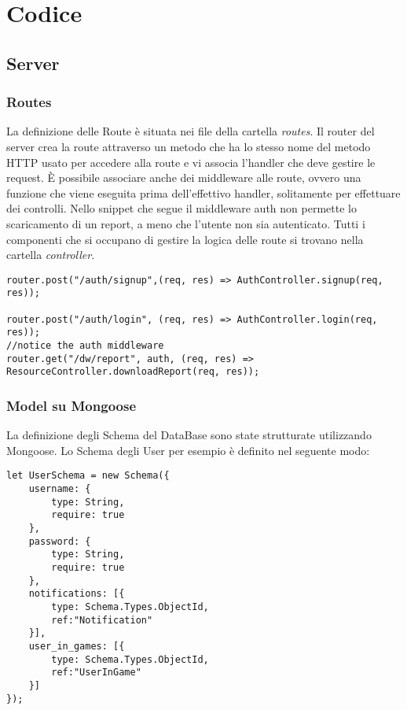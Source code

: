 \chapter{Codice}

\section{Server}

\subsection{Routes}
La definizione delle Route è situata nei file della cartella \textit{routes}.\newline
Il router del server crea la route attraverso un metodo che ha lo stesso nome del metodo HTTP usato per accedere alla route e vi associa l'handler che deve gestire le request.\newline
È possibile associare anche dei middleware alle route, ovvero una funzione che viene eseguita prima dell'effettivo handler, solitamente per effettuare dei controlli.\newline
Nello snippet che segue il middleware auth non permette lo scaricamento di un report, a meno che l'utente non sia autenticato.\newline
Tutti i componenti che si occupano di gestire la logica delle route si trovano nella cartella \textit{controller}.

\begin{verbatim}
router.post("/auth/signup",(req, res) => AuthController.signup(req, res));

router.post("/auth/login", (req, res) => AuthController.login(req, res));
//notice the auth middleware
router.get("/dw/report", auth, (req, res) => ResourceController.downloadReport(req, res));

\end{verbatim}

\subsection{Model su Mongoose}
La definizione degli Schema del DataBase sono state strutturate utilizzando Mongoose. Lo Schema degli User per esempio è definito nel seguente modo:

\begin{verbatim}
let UserSchema = new Schema({
    username: {
        type: String,
        require: true
    },
    password: {
        type: String,
        require: true
    },
    notifications: [{
        type: Schema.Types.ObjectId,
        ref:"Notification"
    }],
    user_in_games: [{
        type: Schema.Types.ObjectId,
        ref:"UserInGame"
    }]
});
\end{verbatim}

